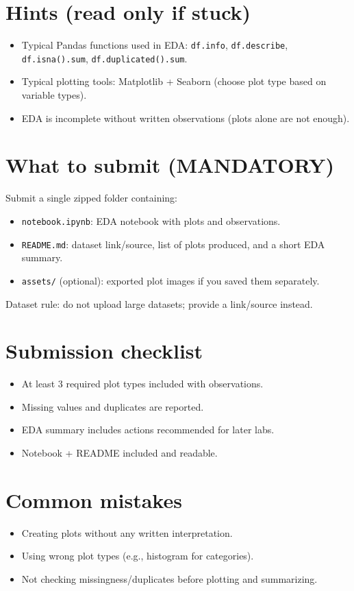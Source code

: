 \documentclass[11pt]{article}
\begin{document}
\section{Hints (read only if stuck)}
\begin{itemize}[leftmargin=*]
  \item Typical Pandas functions used in EDA: \texttt{df.info}, \texttt{df.describe}, \texttt{df.isna().sum}, \texttt{df.duplicated().sum}.
  \item Typical plotting tools: Matplotlib + Seaborn (choose plot type based on variable types).
  \item EDA is incomplete without written observations (plots alone are not enough).
\end{itemize}

\section{What to submit (MANDATORY)}
Submit a single zipped folder containing:
\begin{itemize}[leftmargin=*]
  \item \texttt{notebook.ipynb}: EDA notebook with plots and observations.
  \item \texttt{README.md}: dataset link/source, list of plots produced, and a short EDA summary.
  \item \texttt{assets/} (optional): exported plot images if you saved them separately.
\end{itemize}
Dataset rule: do not upload large datasets; provide a link/source instead.

\section{Submission checklist}
\begin{itemize}[leftmargin=*]
  \item At least 3 required plot types included with observations.
  \item Missing values and duplicates are reported.
  \item EDA summary includes actions recommended for later labs.
  \item Notebook + README included and readable.
\end{itemize}

\section{Common mistakes}
\begin{itemize}[leftmargin=*]
  \item Creating plots without any written interpretation.
  \item Using wrong plot types (e.g., histogram for categories).
  \item Not checking missingness/duplicates before plotting and summarizing.
\end{itemize}

\notesources{\AIMLLabSources}
\end{document}
